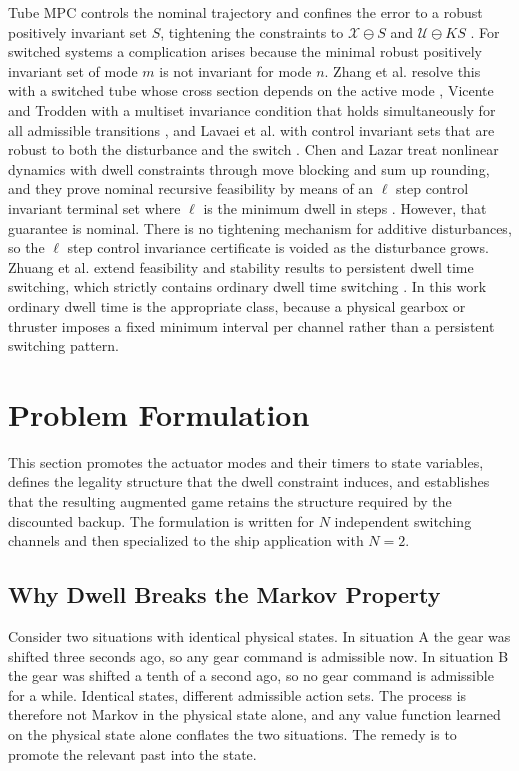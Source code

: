 \documentclass[journal]{IEEEtran}
\begin{document}
Tube MPC controls the nominal trajectory and confines the error to a robust positively invariant set $S$, tightening the constraints to $\mathcal{X} \ominus S$ and $\mathcal{U} \ominus KS$ \cite{mayne2005}. For switched systems a complication arises because the minimal robust positively invariant set of mode $m$ is not invariant for mode $n$. Zhang et al. resolve this with a switched tube whose cross section depends on the active mode \cite{zhang2016}, Vicente and Trodden with a multiset invariance condition that holds simultaneously for all admissible transitions \cite{vicente2019}, and Lavaei et al. with control invariant sets that are robust to both the disturbance and the switch \cite{lavaei2021}. Chen and Lazar treat nonlinear dynamics with dwell constraints through move blocking and sum up rounding, and they prove nominal recursive feasibility by means of an $\ell$ step control invariant terminal set where $\ell$ is the minimum dwell in steps \cite{chenlazar2022}. However, that guarantee is nominal. There is no tightening mechanism for additive disturbances, so the $\ell$ step control invariance certificate is voided as the disturbance grows. Zhuang et al. extend feasibility and stability results to persistent dwell time switching, which strictly contains ordinary dwell time switching \cite{zhuang2023}. In this work ordinary dwell time is the appropriate class, because a physical gearbox or thruster imposes a fixed minimum interval per channel rather than a persistent switching pattern.

\section{Problem Formulation}\label{sec_problem}

This section promotes the actuator modes and their timers to state variables, defines the legality structure that the dwell constraint induces, and establishes that the resulting augmented game retains the structure required by the discounted backup. The formulation is written for $N$ independent switching channels and then specialized to the ship application with $N = 2$.

\subsection{Why Dwell Breaks the Markov Property}

Consider two situations with identical physical states. In situation A the gear was shifted three seconds ago, so any gear command is admissible now. In situation B the gear was shifted a tenth of a second ago, so no gear command is admissible for a while. Identical states, different admissible action sets. The process is therefore not Markov in the physical state alone, and any value function learned on the physical state alone conflates the two situations. The remedy is to promote the relevant past into the state.
\end{document}
